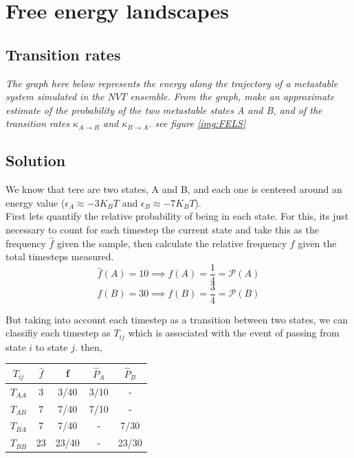 \documentclass{article}
\begin{document}
\section{Free energy landscapes}
\subsection{Transition rates}

\textit{The graph here below represents the energy along the trajectory of a metastable system simulated in the $NVT$ ensemble. From the graph, make an approximate estimate of the probability of the two metastable states A and B, and of the transition rates $\kappa_{A \to B}$ and $\kappa_{B \to A}$. see figure \ref{img:FELS}}

\subsection*{Solution}

We know that tere are two states, A and B, and each one is centered around an energy value ($\epsilon_A \approx -3 K_B T$ and $\epsilon_B \approx -7K_B T$). \\
First lets quantify the relative probability of being in each state. For this, its just necessary to count for each timestep the current state and take this as the frequency $\hat{f}$ given the sample, then calculate the relative frequency $f$ given the total timesteps measured.
\begin{equation}
    \hat{f}(A) = 10 \implies f(A) = \frac{1}{4} = \mathcal{P}(A)
\end{equation}
\begin{equation}
    \hat{f}(B) = 30 \implies f(B) = \frac{3}{4} = \mathcal{P}(B)
\end{equation}

But taking into account each timestep as a transition between two states, we can classifiy each timestep as $T_{ij}$ which is associated with the event of passing from state $i$ to state $j$. then,

\begin{center}
 \begin{tabular}{c | c c c c} 
 \hline
 $T_{ij}$ & $\hat{f}$ & f & $\hat{P}_A$ & $\hat{P}_B$\\ 
 \hline
 $T_{AA}$ & 3 & 3/40  & 3/10 & -\\ 
 $T_{AB}$ & 7 &  7/40 & 7/10 & -\\ 
 $T_{BA}$ & 7 &  7/40 & - & 7/30 \\ 
 $T_{BB}$ & 23 &  23/40 & - & 23/30\\ 
 \hline

\end{tabular}
\end{center}
\end{document}
